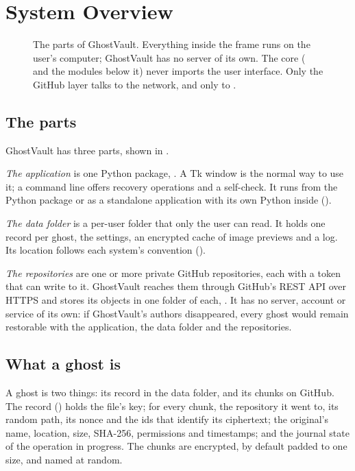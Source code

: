 \section{System Overview}\label{sec:overview}

\begin{figure}[t]
\centering

\caption{The parts of GhostVault. Everything inside the frame runs on the user's computer;
GhostVault has no server of its own. The core ( and the modules below it) never imports
the user interface. Only the GitHub layer talks to the network, and only to .}
\label{fig:architecture}
\end{figure}

\subsection{The parts}
GhostVault has three parts, shown in .

\emph{The application} is one Python package, . A Tk window is the normal way to
use it; a command line offers recovery operations and a self-check. It runs from the Python
package or as a standalone application with its own Python inside ().

\emph{The data folder} is a per-user folder that only the user can read. It holds one record per
ghost, the settings, an encrypted cache of image previews and a log. Its location follows each
system's convention ().

\emph{The repositories} are one or more private GitHub repositories, each with a token that can
write to it. GhostVault reaches them through GitHub's REST API over HTTPS and stores its objects in
one folder of each, . It has no server, account or service of its own: if
GhostVault's authors disappeared, every ghost would remain restorable with the application, the
data folder and the repositories.

\subsection{What a ghost is}
A ghost is two things: its record in the data folder, and its chunks on GitHub. The record
() holds the file's key; for every chunk, the repository it went to, its
random path, its nonce and the ids that identify its ciphertext; the original's name, location,
size, SHA-256, permissions and timestamps; and the journal state of the operation in progress.
The chunks are encrypted, by default padded to one size, and named at random.

